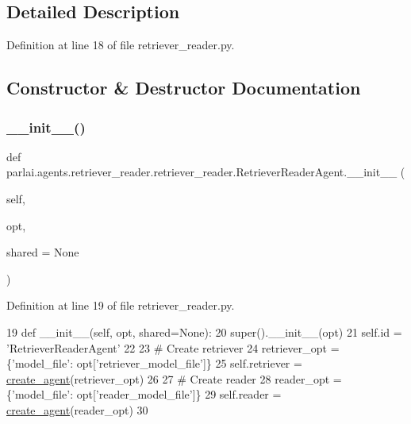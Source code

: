 \subsection{Detailed Description}


Definition at line 18 of file retriever\+\_\+reader.\+py.



\subsection{Constructor \& Destructor Documentation}
\mbox{\label{classparlai_1_1agents_1_1retriever__reader_1_1retriever__reader_1_1RetrieverReaderAgent_a7777973d732eccc4a630116d8a9462f1}} 
\subsubsection{\texorpdfstring{\+\_\+\+\_\+init\+\_\+\+\_\+()}{\_\_init\_\_()}}
{\footnotesize\ttfamily def parlai.\+agents.\+retriever\+\_\+reader.\+retriever\+\_\+reader.\+Retriever\+Reader\+Agent.\+\_\+\+\_\+init\+\_\+\+\_\+ (\begin{DoxyParamCaption}\item[{}]{self,  }\item[{}]{opt,  }\item[{}]{shared = {\ttfamily None} }\end{DoxyParamCaption})}



Definition at line 19 of file retriever\+\_\+reader.\+py.


\begin{DoxyCode}
19     \textcolor{keyword}{def }\_\_init\_\_(self, opt, shared=None):
20         super().\_\_init\_\_(opt)
21         self.id = \textcolor{stringliteral}{'RetrieverReaderAgent'}
22 
23         \textcolor{comment}{# Create retriever}
24         retriever\_opt = \{\textcolor{stringliteral}{'model\_file'}: opt[\textcolor{stringliteral}{'retriever\_model\_file'}]\}
25         self.retriever = \hyperlink{namespaceparlai_1_1core_1_1agents_ad0d54074d4bcc148bb415ab5515a53b5}{create\_agent}(retriever\_opt)
26 
27         \textcolor{comment}{# Create reader}
28         reader\_opt = \{\textcolor{stringliteral}{'model\_file'}: opt[\textcolor{stringliteral}{'reader\_model\_file'}]\}
29         self.reader = \hyperlink{namespaceparlai_1_1core_1_1agents_ad0d54074d4bcc148bb415ab5515a53b5}{create\_agent}(reader\_opt)
30 
\end{DoxyCode}


